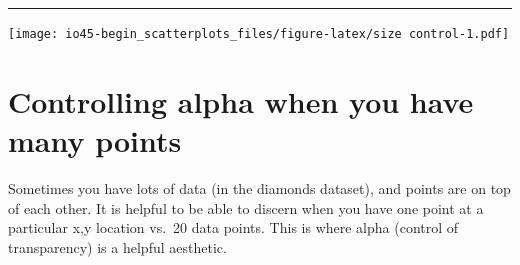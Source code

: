 \documentclass[
]{book}
\newenvironment{Shaded}{\begin{snugshade}}{\end{snugshade}}
\newcommand{\DataTypeTok}[1]{\textcolor[rgb]{0.13,0.29,0.53}{#1}}
\newcommand{\DecValTok}[1]{\textcolor[rgb]{0.00,0.00,0.81}{#1}}
\newcommand{\KeywordTok}[1]{\textcolor[rgb]{0.13,0.29,0.53}{\textbf{#1}}}
\newcommand{\NormalTok}[1]{#1}
\newcommand{\OperatorTok}[1]{\textcolor[rgb]{0.81,0.36,0.00}{\textbf{#1}}}
\newcommand{\StringTok}[1]{\textcolor[rgb]{0.31,0.60,0.02}{#1}}
\begin{document}
\begin{center}\rule{0.5\linewidth}{0.5pt}\end{center}

\begin{Shaded}
\end{Shaded}

\texttt{[image: io45-begin\_scatterplots\_files/figure-latex/size control-1.pdf]}

\hypertarget{controlling-alpha-when-you-have-many-points}{%
\chapter{Controlling alpha when you have many points}\label{controlling-alpha-when-you-have-many-points}}

Sometimes you have lots of data (in the diamonds dataset), and points are on top of each other. It is helpful to be able to discern when you have one point at a particular x,y location vs.~20 data points. This is where alpha (control of transparency) is a helpful aesthetic.

\begin{Shaded}
\end{Shaded}
\end{document}
